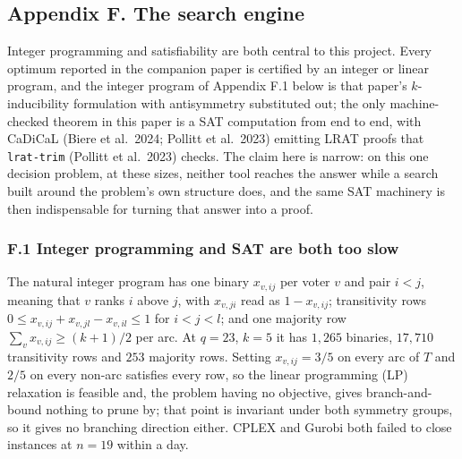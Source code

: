 \documentclass[
]{article}
\begin{document}
\setcounter{table}{0}\setcounter{figure}{0}

\subsection{Appendix F. The search
engine}\label{appendix-f.-the-search-engine}

Integer programming and satisfiability are both central to this project.
Every optimum reported in the companion paper is certified by an integer
or linear program, and the integer program of Appendix F.1 below is that
paper's \(k\)-inducibility formulation with antisymmetry substituted
out; the only machine-checked theorem in this paper is a SAT computation
from end to end, with CaDiCaL (Biere et al.~2024; Pollitt et al.~2023)
emitting LRAT proofs that \texttt{lrat-trim} (Pollitt et al.~2023)
checks. The claim here is narrow: on this one decision problem, at these
sizes, neither tool reaches the answer while a search built around the
problem's own structure does, and the same SAT machinery is then
indispensable for turning that answer into a proof.

\subsubsection{F.1 Integer programming and SAT are both too
slow}\label{f.1-integer-programming-and-sat-are-both-too-slow}

The natural integer program has one binary \(x_{v,ij}\) per voter \(v\)
and pair \(i < j\), meaning that \(v\) ranks \(i\) above \(j\), with
\(x_{v,ji}\) read as \(1 - x_{v,ij}\); transitivity rows
\(0 \le x_{v,ij} + x_{v,jl} - x_{v,il} \le 1\) for \(i < j < l\); and
one majority row \(\sum_{v} x_{v,ij} \ge (k+1)/2\) per arc. At
\(q = 23\), \(k = 5\) it has \(1{,}265\) binaries, \(17{,}710\)
transitivity rows and \(253\) majority rows. Setting \(x_{v,ij} = 3/5\)
on every arc of \(T\) and \(2/5\) on every non-arc satisfies every row,
so the linear programming (LP) relaxation is feasible and, the problem
having no objective, gives branch-and-bound nothing to prune by; that
point is invariant under both symmetry groups, so it gives no branching
direction either. CPLEX and Gurobi both failed to close instances at
\(n = 19\) within a day.
\end{document}
